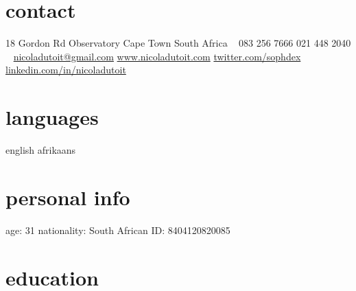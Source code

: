 \documentclass[]{friggeri-cv} %
\begin{document}

\begin{aside} %
\section{contact}
18 Gordon Rd
Observatory
Cape Town
South Africa
~
083 256 7666
021 448 2040
~
\href{mailto:nicoladutoit@gmail.com}{nicoladutoit@gmail.com}
\href{http://www.nicoladutoit.com}{www.nicoladutoit.com}
\href{https://twitter.com/sophdex}{twitter.com/sophdex}
\href{http://za.linkedin.com/in/nicoladutoit/}{linkedin.com/in/nicoladutoit}
\section{languages}
english 
afrikaans
\section{personal info}
age: 31
nationality: South African
ID: 8404120820085
\end{aside}


\section{education}
\end{document}
